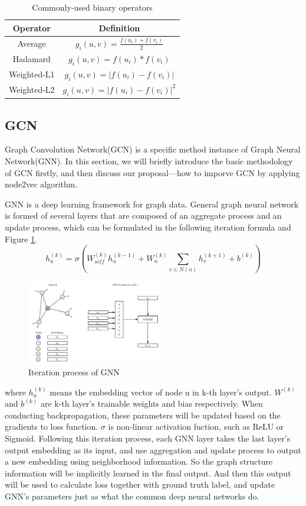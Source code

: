 \documentclass[sigconf]{acmart}
\begin{document}
    \begin{table}[!ht]
	\caption{Commonly-used binary operators}
	\label{linkop}
	\centering
	\begin{tabular}{cc}
		\toprule
		\textbf{Operator} &  \textbf{Definition} \\
		\midrule
		Average & $g_i(u,v)=\frac{f(u_i)+f(v_i)}{2}$ \\
		Hadamard & $g_i(u,v)=f(u_i)*f(v_i)$ \\
		Weighted-L1  & $g_i(u,v)=|f(u_i)-f(v_i)|$  \\
		Weighted-L2 & $g_i(u,v)=|f(u_i)-f(v_i)|^2$  \\
		\bottomrule
	\end{tabular}
\end{table}

\subsection{GCN}
Graph Convolution Network(GCN) is a specific method instance of Graph Neural Network(GNN). In this section,  we will briefly introduce the basic methodology of GCN firstly, and then discuss our proposal---how to imporve GCN by applying node2vec algorithm. 

GNN is a deep learning framework for graph data. General graph neural network is formed of several layers that are composed of an aggregate process and an update process, which can be formulated in the following iteration formula and Figure \ref{gnn}.
$$h_u^{(k)}=\sigma(W_{self}^{(k)}h_u^{(k-1)}+W_n^{(k)}\sum_{v\in N(u)}h_v^{(k+1)}+b^{(k)})$$
\begin{figure}[h!]
	\centering
	\includegraphics[width=6cm]{gnn.png}
	\caption{Iteration process of GNN}
	\label{gnn}
\end{figure}
where $h_u^{(k)}$ means the embedding vector of node u in k-th layer's output. $W^{(k)}$ and $b^{(k)}$ are k-th layer's trainable weights and bias respectively. When conducting backpropagation, these parameters will be updated based on the gradients to loss function. $\sigma$ is non-linear activation fuction, such as ReLU or Sigmoid. Following this iteration process, each GNN layer takes the last layer’s output embedding as its input, and use aggregation and update process to output a new embedding using neighborhood information. So the graph structure information will be implicitly learned in the final output. And then this output will be used to calculate loss together with ground truth label, and update GNN's parameters just as what the common deep neural networks do.
\end{document}
